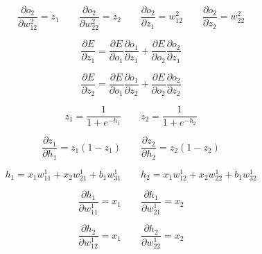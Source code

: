 \documentclass{article}
\begin{document}
    \begin{equation*}
        \frac{\partial o_2}{\partial w_{12}^2} = z_1
        \qquad %
        \frac{\partial o_2}{\partial w_{22}^2} = z_2
        \qquad %
        \frac{\partial o_2}{\partial z_1} = w_{12}^2
        \qquad %
        \frac{\partial o_2}{\partial z_2} = w_{22}^2
    \end{equation*}

    \begin{equation*}
        \frac{\partial E}{\partial z_1} = 
        \frac{\partial E}{\partial o_1} \frac{\partial o_1}{\partial z_1} +
        \frac{\partial E}{\partial o_2} \frac{\partial o_2}{\partial z_1}
    \end{equation*}

    \begin{equation*}
        \frac{\partial E}{\partial z_2} = 
        \frac{\partial E}{\partial o_1} \frac{\partial o_1}{\partial z_2} +
        \frac{\partial E}{\partial o_2} \frac{\partial o_2}{\partial z_2}
    \end{equation*}

    \begin{equation}
        z_1 = \frac{1}{1+ e^{-h_1}} 
        \qquad %
        z_2 = \frac{1}{1+ e^{-h_2}} 
    \end{equation}

    \begin{equation*}
        \frac{\partial z_1}{\partial h_1} = z_1 (1 - z_1)
        \qquad %
        \frac{\partial z_2}{\partial h_2} = z_2 (1 - z_2)
    \end{equation*}

    \begin{equation}
        h_1 =  x_1 w_{11}^1 + x_2 w_{21}^1 + b_1 w_{31}^1
        \qquad %
        h_2 =  x_1 w_{12}^1 + x_2 w_{22}^1 + b_1 w_{32}^1
    \end{equation}

    \begin{equation*}
        \frac{\partial h_1}{\partial w_{11}^1} = x_1
        \qquad %
        \frac{\partial h_1}{\partial w_{21}^1} = x_2
    \end{equation*}

    \begin{equation*}
        \frac{\partial h_2}{\partial w_{12}^1} = x_1
        \qquad %
        \frac{\partial h_2}{\partial w_{22}^1} = x_2
    \end{equation*}
\end{document}
